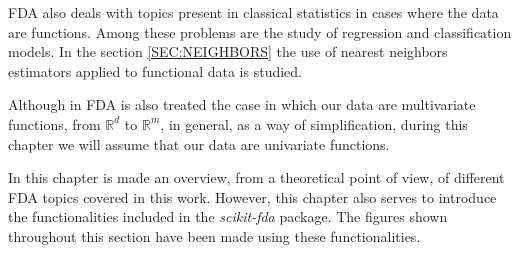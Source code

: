\acs{FDA} also deals with topics present in classical statistics in cases where the
data are functions. Among these problems are the study of regression and
classification models. In the section \ref{SEC:NEIGHBORS} the use of nearest
neighbors estimators applied to functional data is studied.

Although in \acs{FDA} is also treated the case in which our data are multivariate
functions, from  $\mathbb{R}^d$ to $\mathbb{R}^m$, in general, as a way of
simplification, during this chapter we will assume that our data are
univariate functions.

In this chapter is made an overview, from a theoretical point of view, of
different \acs{FDA} topics covered in this work. However, this chapter also serves
to introduce the functionalities included in the \textit{scikit-fda} package.
The figures shown throughout this section have been made using these functionalities.
